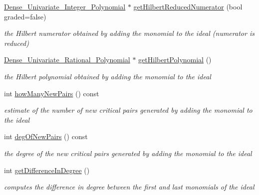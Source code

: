 \begin{Indent}
\begin{DoxyCompactItemize}
\hyperlink{class_dense___univariate___integer___polynomial}{Dense\+\_\+\+Univariate\+\_\+\+Integer\+\_\+\+Polynomial} $\ast$ \hyperlink{class_p_p_with_ideal_ad703f1e2a2ee6f4f5862146f52d8b4e4}{get\+Hilbert\+Reduced\+Numerator} (bool graded=false)
\begin{DoxyCompactList}\small\item\em the Hilbert numerator obtained by adding the monomial to the ideal (numerator {\itshape is} reduced) \end{DoxyCompactList}\item 
\mbox{\label{class_p_p_with_ideal_aea3816cc16c31cc0465f6e71b5499444}} 
\hyperlink{class_dense___univariate___rational___polynomial}{Dense\+\_\+\+Univariate\+\_\+\+Rational\+\_\+\+Polynomial} $\ast$ \hyperlink{class_p_p_with_ideal_aea3816cc16c31cc0465f6e71b5499444}{get\+Hilbert\+Polynomial} ()
\begin{DoxyCompactList}\small\item\em the Hilbert polynomial obtained by adding the monomial to the ideal \end{DoxyCompactList}\item 
\mbox{\label{class_p_p_with_ideal_ae56bffc5abc6e09e0f393d90687b91ab}} 
int \hyperlink{class_p_p_with_ideal_ae56bffc5abc6e09e0f393d90687b91ab}{how\+Many\+New\+Pairs} () const
\begin{DoxyCompactList}\small\item\em estimate of the number of new critical pairs generated by adding the monomial to the ideal \end{DoxyCompactList}\item 
\mbox{\label{class_p_p_with_ideal_aa672d26c042569006512f3ac0fe1de34}} 
int \hyperlink{class_p_p_with_ideal_aa672d26c042569006512f3ac0fe1de34}{deg\+Of\+New\+Pairs} () const
\begin{DoxyCompactList}\small\item\em the degree of the new critical pairs generated by adding the monomial to the ideal \end{DoxyCompactList}\item 
\mbox{\label{class_p_p_with_ideal_a7dd8fea0916e829944f63107a288ed58}} 
int \hyperlink{class_p_p_with_ideal_a7dd8fea0916e829944f63107a288ed58}{get\+Difference\+In\+Degree} ()
\begin{DoxyCompactList}\small\item\em computes the difference in degree between the first and last monomials of the ideal \end{DoxyCompactList}\end{DoxyCompactItemize}
\end{Indent}
